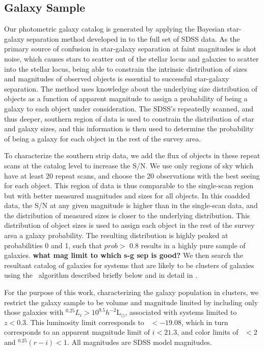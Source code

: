 \documentclass{emulateapj}
\begin{document}
\subsection{Galaxy Sample}
Our photometric galaxy catalog is generated by applying the Bayesian
star-galaxy separation method developed in \citet{Scranton02} to the
full set of SDSS data. As the primary source of confusion in
star-galaxy separation at faint magnitudes is shot noise, which causes
stars to scatter out of the stellar locus and galaxies to scatter into
the stellar locus, being able to constrain the intrinsic distribution
of sizes and magnitudes of observed objects is essential to successful
star-galaxy separation. The \citet{Scranton02} method uses knowledge
about the underlying size distribution of objects as a function of
apparent magnitude to assign a probability of being a galaxy to each
object under consideration. The SDSS's repeatedly scanned, and thus
deeper, southern region of data is used to constrain the distribution
of star and galaxy sizes, and this information is then used to
determine the probability of being a galaxy for each object in the
rest of the survey area.

To characterize the southern strip data, we add the flux of objects in
these repeat scans at the catalog level to increase the S/N. We use only regions of sky which have at least 20 repeat scans, and choose the 20 observations with the best seeing for each object. This
region of data is thus comparable to the single-scan region but with
better measured magnitudes and sizes for all objects.  In this coadded
data, the S/N at any given magnitude is higher than in the single-scan
data, and the distribution of measured sizes is closer to the
underlying distribution.  This distribution of object sizes is used to
assign each object in the rest of the survey area a galaxy
probability.  The resulting distribution is highly peaked at
probabilities 0 and 1, such that $prob >$ 0.8 results in a highly pure
sample of galaxies. {\bf what mag limit to which s-g sep is good?} We
then search the resultant catalog of galaxies for systems that are
likely to be clusters of galaxies using the \maxbcg\ algorithm described
briefly below and in detail in \citet{Koester07a}.

For the purpose of this work, characterizing the galaxy population in
clusters, we restrict the galaxy sample to be volume and magnitude
limited by including only those galaxies with $^{0.25}L_i > 10^{9.5}
h^{-2}$L$_{\odot}$, associated with systems limited to $z < 0.3$.
This luminosity limit corresponds to \Mi\ $< -19.08$, which in
turn corresponds to an apparent magnitude limit of $i < 21.3$, and
color limits of \gmr\ $< 2$ and $^{0.25}(r-i) < 1$. All magnitudes are SDSS model magnitudes.
\end{document}
